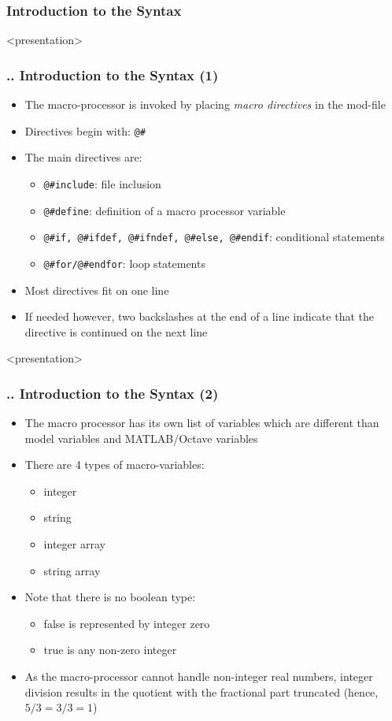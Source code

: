 \documentclass[11pt,aspectratio=169]{beamer}
\begin{document}
\subsubsection{Introduction to the Syntax}
\begin{frame}<presentation>
	\frametitle{{\thesection.\thesubsection.\thesubsubsection} Introduction to the Syntax (1)}
	\begin{itemize}
		\item The macro-processor is invoked by placing \textit{macro directives} in the mod-file
		\item Directives begin with: \texttt{@\#}  
		\item The main directives are:
		\begin{itemize}
			\item \texttt{@\#include}: file inclusion
			\item \texttt{@\#define}: definition of a macro processor variable
			\item \texttt{@\#if, @\#ifdef, @\#ifndef, @\#else, @\#endif}: conditional statements
			\item \texttt{@\#for/@\#endfor}: loop statements 
		\end{itemize}
	\item Most directives fit on one line
	\item If needed however, two backslashes at the end of a line indicate that the directive is continued on the next line
	\end{itemize}
\end{frame}
\begin{frame}<presentation>
	\frametitle{{\thesection.\thesubsection.\thesubsubsection} Introduction to the Syntax (2)}
	\begin{itemize}
		\item The macro processor has its own list of variables which are different than model variables and MATLAB/Octave variables
		\item There are 4 types of macro-variables:
		\begin{itemize}
			\item integer 
			\item string 
			\item integer array 
			\item string array
		\end{itemize}
		\item Note that there is no boolean type:
		\begin{itemize}
			\item false is represented by integer zero
			\item true is any non-zero integer
		\end{itemize} 
		\item As the macro-processor cannot handle non-integer real numbers, integer division results in the quotient with the fractional part truncated (hence, $5/3=3/3=1$)
	\end{itemize}
\end{frame}
\end{document}
